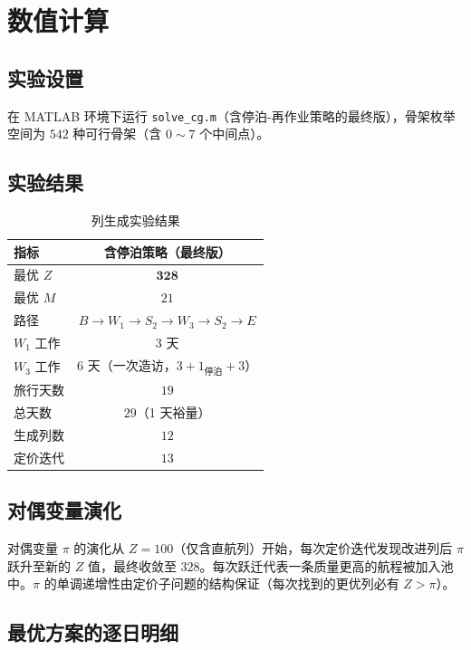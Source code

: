 \documentclass[12pt,a4paper]{ctexart}
\theoremstyle{definition}
\begin{document}
\section{数值计算}

\subsection{实验设置}

在 MATLAB 环境下运行 \texttt{solve\_cg.m}（含停泊-再作业策略的最终版），骨架枚举空间为 $542$ 种可行骨架（含 $0\sim 7$ 个中间点）。

\subsection{实验结果}

\begin{table}[H]
  \centering
  \caption{列生成实验结果}
  \begin{tabular}{lc}
    \toprule
    指标 & 含停泊策略（最终版） \\
    \midrule
    最优 $Z$    & $\mathbf{328}$ \\
    最优 $M$    & $21$ \\
    路径        & $B\!\to\!W_1\!\to\!S_2\!\to\!W_3\!\to\!S_2\!\to\!E$ \\
    $W_1$ 工作  & $3$ 天 \\
    $W_3$ 工作  & $6$ 天（一次造访，$3+1_{\text{停泊}}+3$） \\
    旅行天数    & $19$ \\
    总天数      & $29$（1 天裕量） \\
    生成列数    & $12$ \\
    定价迭代    & $13$ \\
    \bottomrule
  \end{tabular}
\end{table}

\subsection{对偶变量演化}

对偶变量 $\pi$ 的演化从 $Z=100$（仅含直航列）开始，每次定价迭代发现改进列后 $\pi$ 跃升至新的 $Z$ 值，最终收敛至 $328$。每次跃迁代表一条质量更高的航程被加入池中。$\pi$ 的单调递增性由定价子问题的结构保证（每次找到的更优列必有 $Z>\pi$）。

\subsection{最优方案的逐日明细}
\end{document}
